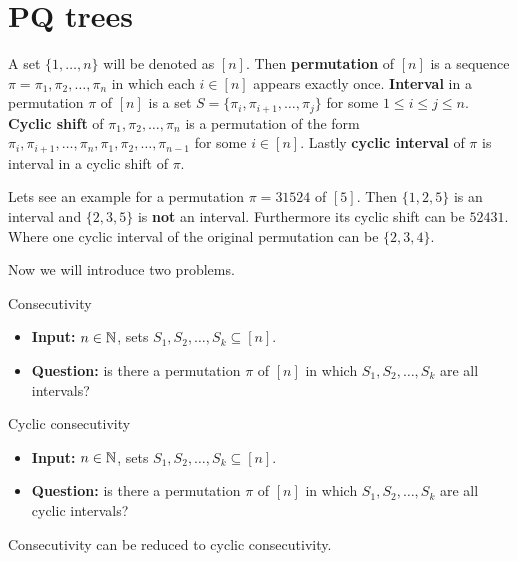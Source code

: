 \chapter{PQ trees}

\begin{notation}
	A set $\{1, \dots, n\}$ will be denoted as $[n]$. Then \textbf{permutation} of $[n]$ is a sequence $\pi = \pi_1, \pi_2, \dots, \pi_n$ in which each $i \in [n]$ appears exactly once. \textbf{Interval} in a permutation $\pi$ of $[n]$ is a set $S = \{\pi_i, \pi_{i+1}, \dots, \pi_j\}$ for some $1 \leq i \leq j \leq n$. \textbf{Cyclic shift} of $\pi_1, \pi_2, \dots, \pi_n$ is a permutation of the form $\pi_i, \pi_{i+1}, \dots, \pi_n, \pi_1, \pi_2, \dots, \pi_{n-1}$ for some $i \in [n]$. Lastly \textbf{cyclic interval} of $\pi$ is interval in a cyclic shift of $\pi$.
\end{notation}

\begin{example}
	Lets see an example for a permutation $\pi = 31524$ of $[5]$. Then $\{1,2,5\}$ is an interval and $\{2,3,5\}$ is \textbf{not} an interval. Furthermore its cyclic shift can be $52431$. Where one cyclic interval of the original permutation can be $\{2,3,4\}$.
\end{example}

Now we will introduce two problems.

\begin{mybox}{Consecutivity}
	\begin{itemize}[]
		\item \textbf{Input:} $n \in \mathbb{N}$, sets $S_1, S_2, \dots, S_k \subseteq [n]$.
		\item \textbf{Question:} is there a permutation $\pi$ of $[n]$ in which $S_1, S_2, \dots, S_k$ are all intervals?
	\end{itemize}
\end{mybox}

\begin{mybox}{Cyclic consecutivity}
	\begin{itemize}[]
		\item \textbf{Input:} $n \in \mathbb{N}$, sets $S_1, S_2, \dots, S_k \subseteq [n]$.
		\item \textbf{Question:} is there a permutation $\pi$ of $[n]$ in which $S_1, S_2, \dots, S_k$ are all cyclic intervals?
	\end{itemize}
\end{mybox}

\begin{lemma}
	Consecutivity can be reduced to cyclic consecutivity.
\end{lemma}

